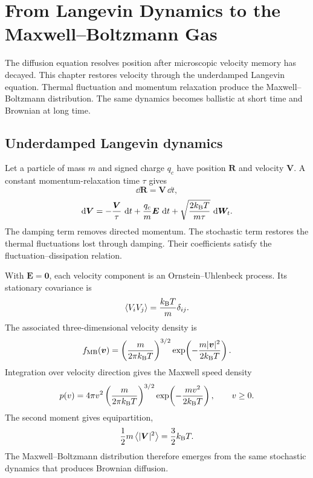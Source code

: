 \chapter{From Langevin Dynamics to the Maxwell--Boltzmann Gas}
\label{ch:langevin-maxwell-boltzmann}

The diffusion equation resolves position after microscopic velocity memory has
decayed.  This chapter restores velocity through the underdamped Langevin
equation.  Thermal fluctuation and momentum relaxation produce the
Maxwell--Boltzmann distribution.  The same dynamics becomes ballistic at short
time and Brownian at long time.

\section{Underdamped Langevin dynamics}

Let a particle of mass $m$ and signed charge $q_c$ have position $\bm R$ and
velocity $\bm V$.  A constant momentum-relaxation time $\tau$ gives
\begin{equation}
  \dd\bm R=\bm V\,\dd t,
  \label{eq:thermal-gas-position}
\end{equation}
\begin{equation}
  \mathop{}\!\mathrm{d}\bm V
  =-\frac{\bm V}{\tau}\,\mathop{}\!\mathrm{d} t
   +\frac{q_c}{m}\bm E\,\mathop{}\!\mathrm{d} t
   +\sqrt{\frac{2k_{\mathrm B} T}{m\tau}}\,\mathop{}\!\mathrm{d}\bm W_t.
  \label{eq:thermal-gas-langevin}
\end{equation}
The damping term removes directed momentum.  The stochastic term restores the
thermal fluctuations lost through damping.  Their coefficients satisfy the
fluctuation--dissipation relation.

With $\bm E=\bm0$, each velocity component is an Ornstein--Uhlenbeck process.
Its stationary covariance is
\begin{equation}
  \left\langle V_iV_j\right\rangle
  =\frac{k_{\mathrm B} T}{m}\delta_{ij}.
  \label{eq:thermal-gas-velocity-covariance}
\end{equation}
The associated three-dimensional velocity density is
\begin{equation}
  f_{\mathrm{MB}}(\bm v)
  =\left(\frac{m}{2\pi k_{\mathrm B} T}\right)^{3/2}
   \exp\!\left(-\frac{m|\bm v|^2}{2k_{\mathrm B} T}\right).
  \label{eq:thermal-gas-maxwell-boltzmann}
\end{equation}
Integration over velocity direction gives the Maxwell speed density
\begin{equation}
  p(v)
  =4\pi v^2
   \left(\frac{m}{2\pi k_{\mathrm B} T}\right)^{3/2}
   \exp\!\left(-\frac{mv^2}{2k_{\mathrm B} T}\right),
  \qquad v\geq0.
  \label{eq:thermal-gas-maxwell-speed}
\end{equation}
The second moment gives equipartition,
\begin{equation}
  \frac12m\left\langle|\bm V|^2\right\rangle
  =\frac32k_{\mathrm B} T.
  \label{eq:thermal-gas-equipartition}
\end{equation}
The Maxwell--Boltzmann distribution therefore emerges from the same stochastic
dynamics that produces Brownian diffusion.

